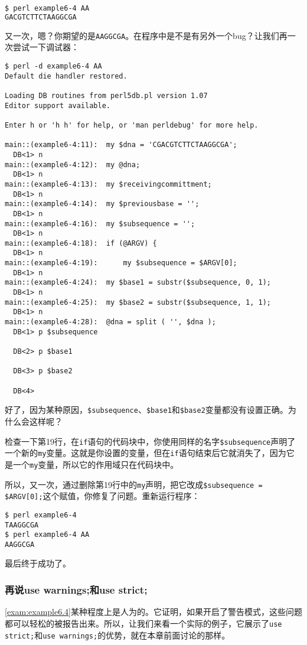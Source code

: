\begin{lstlisting}[language=bash]
$ perl example6-4 AA
GACGTCTTCTAAGGCGA
\end{lstlisting}

又一次，嗯？你期望的是\verb|AAGGCGA|。在程序中是不是有另外一个bug？让我们再一次尝试一下调试器：

\begin{lstlisting}
$ perl -d example6-4 AA
Default die handler restored.

Loading DB routines from perl5db.pl version 1.07
Editor support available.

Enter h or 'h h' for help, or 'man perldebug' for more help.

main::(example6-4:11):	my $dna = 'CGACGTCTTCTAAGGCGA';
  DB<1> n
main::(example6-4:12):	my @dna;
  DB<1> n
main::(example6-4:13):	my $receivingcommittment;
  DB<1> n
main::(example6-4:14):	my $previousbase = ''; 
  DB<1> n
main::(example6-4:16):	my $subsequence = '';
  DB<1> n
main::(example6-4:18):	if (@ARGV) {
  DB<1> n
main::(example6-4:19):	    my $subsequence = $ARGV[0];
  DB<1> n
main::(example6-4:24):	my $base1 = substr($subsequence, 0, 1);
  DB<1> n
main::(example6-4:25):	my $base2 = substr($subsequence, 1, 1);
  DB<1> n
main::(example6-4:28):	@dna = split ( '', $dna );
  DB<1> p $subsequence

  DB<2> p $base1

  DB<3> p $base2

  DB<4> 
\end{lstlisting}

好了，因为某种原因，\verb|$subsequence|、\verb|$base1|和\verb|$base2|变量都没有设置正确。为什么会这样呢？

检查一下第19行，在\verb|if|语句的代码块中，你使用同样的名字\verb|$subsequence|声明了一个新的\verb|my|变量。这就是你设置的变量，但在\verb|if|语句结束后它就消失了，因为它是一个\verb|my|变量，所以它的作用域只在代码块中。

所以，又一次，通过删除第19行中的\verb|my|声明，把它改成\verb|$subsequence = $ARGV[0];|这个赋值，你修复了问题。重新运行程序：

\begin{lstlisting}
$ perl example6-4
TAAGGCGA
$ perl example6-4 AA
AAGGCGA 
\end{lstlisting}

最后终于成功了。

\subsubsection{再说use warnings;和use strict;}
\autoref{exam:example6.4}某种程度上是人为的。它证明，如果开启了警告模式，这些问题都可以轻松的被报告出来。所以，让我们来看一个实际的例子，它展示了\verb|use strict;|和\verb|use warnings;|的优势，就在本章前面讨论的那样。

